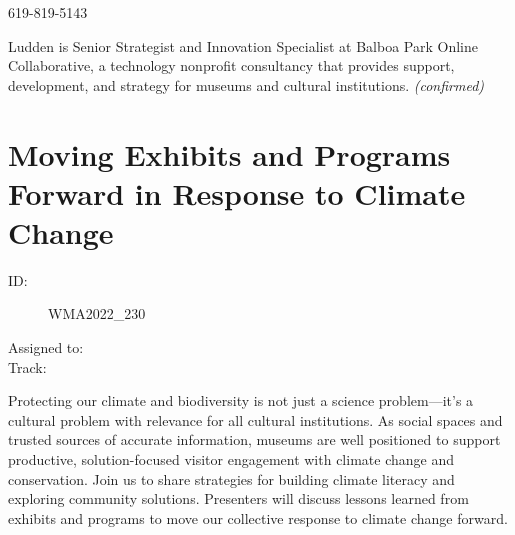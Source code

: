 \documentclass{report}
\begin{document}
                619-819-5143 \newline

                Ludden is Senior Strategist and Innovation Specialist at Balboa Park Online Collaborative, a technology nonprofit consultancy that provides support, development, and strategy for museums and cultural institutions.
                \emph{ (confirmed) }
              

              
        
          \newpage
          \section{ Moving Exhibits and Programs Forward in Response to Climate Change }
            \begin{description}
              \item [ID:]
              WMA2022\_230

              \item [Assigned to:]
                \item [Track:]
              \end{description}

              Protecting our climate and biodiversity is not just a science problem—it’s a cultural problem with relevance for all cultural institutions. As social spaces and trusted sources of accurate information, museums are well positioned to support productive, solution-focused visitor engagement with climate change and conservation. Join us to share strategies for building climate literacy and exploring community solutions. Presenters will discuss lessons learned from exhibits and programs to move our collective response to climate change forward.
\end{document}
